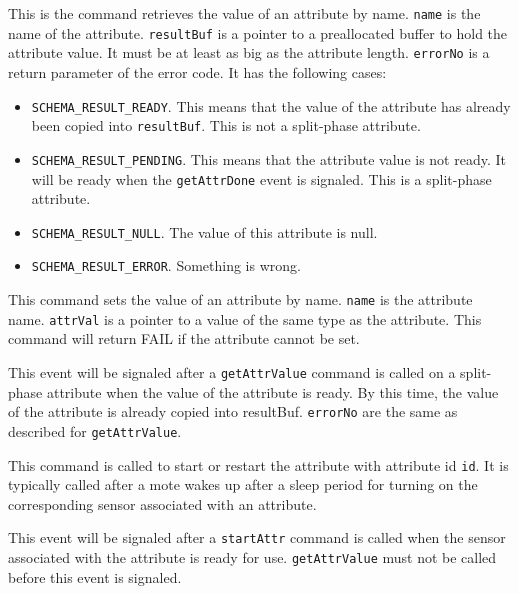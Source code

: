 \documentclass[11pt]{article}
\begin{document}
This is the command retrieves the value of an attribute by name.
{\tt name} is the name of the attribute.  {\tt resultBuf} is a pointer to
a preallocated buffer to hold the attribute value.  It must be at least
as big as the attribute length.  {\tt errorNo} is a return parameter of
the error code.  It has the following cases:
\begin{itemize}
\item {\tt SCHEMA\_RESULT\_READY}.  This means
that the value of the attribute has already been copied into {\tt resultBuf}.
This is not a split-phase attribute.
\item {\tt SCHEMA\_RESULT\_PENDING}.  This means that
the attribute value is not ready.  It will be ready when the 
{\tt getAttrDone} event is signaled.  This is a split-phase attribute.
\item {\tt SCHEMA\_RESULT\_NULL}.  The value of this attribute is null.
\item {\tt SCHEMA\_RESULT\_ERROR}.  Something is wrong.
\end{itemize}



This command sets the value of an attribute by name.  {\tt name} is the attribute name.  {\tt attrVal} is a pointer to a value of the same type as the
attribute.  This command will return FAIL if the attribute cannot be set.



This event will be signaled after a {\tt getAttrValue} command is called on
a split-phase attribute when the value of the attribute is ready.
By this time, the value of the attribute is already copied into resultBuf.
{\tt errorNo} are the same as described for {\tt getAttrValue}.


This command is called to start or restart the attribute with attribute id
{\tt id}.  It is typically
called after a mote wakes up after a sleep period for turning on 
the corresponding
sensor associated with an attribute.



This event will be signaled after a {\tt startAttr} command is called
when the sensor associated with the attribute is ready for use.
{\tt getAttrValue} must not be called before this event is signaled.
\end{document}
